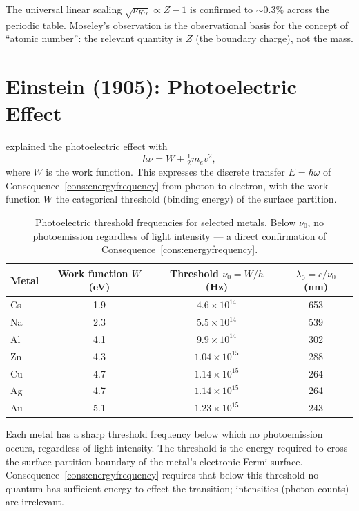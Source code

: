The universal linear scaling $\sqrt{\nu_{K\alpha}}\propto Z-1$ is confirmed
to $\sim 0.3\%$ across the periodic table.  Moseley's observation is the
observational basis for the concept of ``atomic number'': the relevant
quantity is $Z$ (the boundary charge), not the mass.

\section{Einstein (1905): Photoelectric Effect}
\label{sec:photoelectric-ch25}

\citet{einstein1905photoelectric} explained the photoelectric effect with
\begin{equation*}
  h\nu=W+\tfrac{1}{2}m_{e}v^{2},
\end{equation*}
where $W$ is the work function.  This expresses the discrete transfer
$E=\hbar\omega$ of Consequence~\ref{cons:energyfrequency} from photon to
electron, with the work function $W$ the categorical threshold (binding
energy) of the surface partition.

\begin{table}[htbp]
\centering
\caption{Photoelectric threshold frequencies for selected metals.
Below $\nu_{0}$, no photoemission regardless of light intensity
--- a direct confirmation of Consequence~\ref{cons:energyfrequency}.}
\label{tab:photoelectric}
\begin{tabular}{@{}lccc@{}}
\toprule
Metal & Work function $W$ (eV) &
  Threshold $\nu_{0}=W/h$ (Hz) & $\lambda_{0}=c/\nu_{0}$ (nm) \\
\midrule
Cs  & 1.9 & $4.6\times 10^{14}$ & 653 \\
Na  & 2.3 & $5.5\times 10^{14}$ & 539 \\
Al  & 4.1 & $9.9\times 10^{14}$ & 302 \\
Zn  & 4.3 & $1.04\times 10^{15}$ & 288 \\
Cu  & 4.7 & $1.14\times 10^{15}$ & 264 \\
Ag  & 4.7 & $1.14\times 10^{15}$ & 264 \\
Au  & 5.1 & $1.23\times 10^{15}$ & 243 \\
\bottomrule
\end{tabular}
\end{table}

Each metal has a sharp threshold frequency below which no photoemission
occurs, regardless of light intensity.  The threshold is the energy required
to cross the surface partition boundary of the metal's electronic Fermi
surface.  Consequence~\ref{cons:energyfrequency} requires that below this
threshold no quantum has sufficient energy to effect the transition;
intensities (photon counts) are irrelevant.

